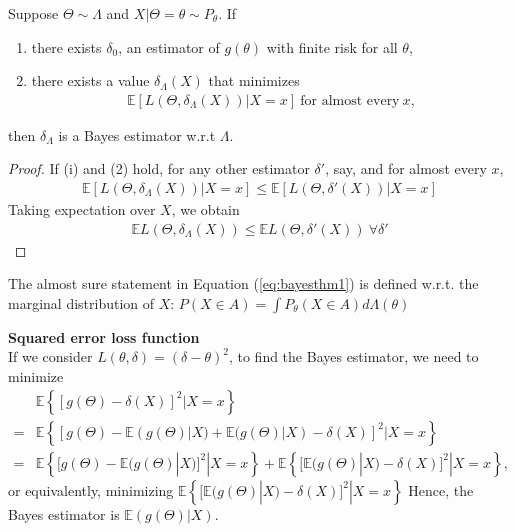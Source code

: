 \begin{theorem}
    Suppose $\Theta\sim\Lambda$ and $X|\Theta=\theta\sim P_\theta$. 
    If 
    \begin{enumerate}[{(i)}]
        \item there exists $\delta_0$, an estimator of $g(\theta)$ with finite risk for all $\theta$,
        \item there exists a value $\delta_\Lambda(X)$ that minimizes 
        \begin{gather}
            \mathbb{E}[L(\Theta,\delta_\Lambda(X))|X=x]~\text{for almost every}~x,\label{eq:bayesthm1}
        \end{gather}
    \end{enumerate}
    then $\delta_\Lambda$ is a Bayes estimator w.r.t $\Lambda$.
\end{theorem}
\begin{proof}
    If (i) and (2) hold, for any other estimator $\delta'$, say, and for almost every $x$,
    \begin{gather}
        \mathbb{E}[L(\Theta,\delta_\Lambda(X))|X=x]\leq\mathbb{E}[L(\Theta,\delta'(X))|X=x]
    \end{gather}
    Taking expectation over $X$, we obtain
    \begin{gather}
        \mathbb{E}L(\Theta,\delta_\Lambda(X))\leq\mathbb{E}L(\Theta,\delta'(X))~\forall{\delta'}
    \end{gather}
\end{proof}

\begin{note}
    The almost sure statement in Equation (\ref{eq:bayesthm1}) is defined 
    w.r.t. the marginal distribution of $X$: $P(X\in A)=\int{P_\theta(X\in A)}d\Lambda(\theta)$
\end{note}

\begin{example}
    \textbf{Squared error loss function}\\
    If we consider $L(\theta,\delta)=(\delta-\theta)^2$, 
    to find the Bayes estimator, 
    we need to minimize 
    \begin{align}
        &\mathbb{E}\left\{[g(\Theta)-\delta(X)]^2|X=x\right\}\\
        =& \mathbb{E}\left\{
            [g(\Theta) - \mathbb{E}(g(\Theta)|X) + \mathbb{E}(g(\Theta)|X) - \delta(X)]^2 | X=x
        \right\}\\
        =& \mathbb{E}\left\{
            [g(\Theta) - \mathbb{E}(g(\Theta)|X)]^2 | X=x
        \right\} + 
        \mathbb{E}\left\{
            [\mathbb{E}(g(\Theta)|X) - \delta(X)]^2 | X=x
        \right\},
    \end{align}
    or equivalently, minimizing $\mathbb{E}\left\{
            [\mathbb{E}(g(\Theta)|X) - \delta(X)]^2 | X=x
        \right\}$
    Hence, the Bayes estimator is $\mathbb{E}(g(\Theta)|X)$.
\end{example}

